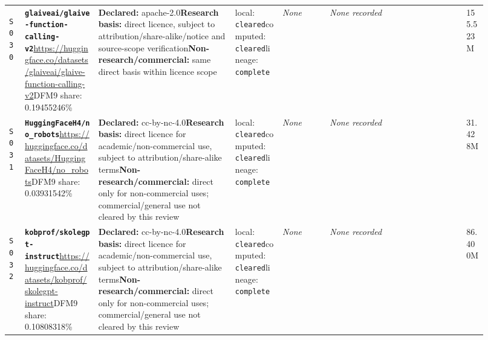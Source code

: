 \documentclass[9pt,a4paper]{article}
\newcommand{\srcid}[1]{\hypertarget{src:#1}{\texttt{#1}}}
\begin{document}
\begin{landscape}
\begin{longtable}{@{}L{0.03\linewidth}L{0.14\linewidth}L{0.26\linewidth}L{0.09\linewidth}L{0.09\linewidth}L{0.265\linewidth}L{0.045\linewidth}@{}}
\srcid{S030} & \textbf{\nolinkurl{glaiveai/glaive-function-calling-v2}}\newline \url{https://huggingface.co/datasets/glaiveai/glaive-function-calling-v2}\newline DFM9 share: 0.19455246\% & \textbf{Declared:} apache-2.0\newline \textbf{Research basis:} direct licence, subject to attribution/share-alike/notice and source-scope verification\newline \textbf{Non-research/commercial:} same direct basis within licence scope & local: \texttt{cleared}\newline computed: \texttt{cleared}\newline lineage: \texttt{complete} & \textit{None} & \textit{None recorded} & 155.523M \\
\srcid{S031} & \textbf{\nolinkurl{HuggingFaceH4/no_robots}}\newline \url{https://huggingface.co/datasets/HuggingFaceH4/no_robots}\newline DFM9 share: 0.03931542\% & \textbf{Declared:} cc-by-nc-4.0\newline \textbf{Research basis:} direct licence for academic/non-commercial use, subject to attribution/share-alike terms\newline \textbf{Non-research/commercial:} direct only for non-commercial uses; commercial/general use not cleared by this review & local: \texttt{cleared}\newline computed: \texttt{cleared}\newline lineage: \texttt{complete} & \textit{None} & \textit{None recorded} & 31.428M \\
\srcid{S032} & \textbf{\nolinkurl{kobprof/skolegpt-instruct}}\newline \url{https://huggingface.co/datasets/kobprof/skolegpt-instruct}\newline DFM9 share: 0.10808318\% & \textbf{Declared:} cc-by-nc-4.0\newline \textbf{Research basis:} direct licence for academic/non-commercial use, subject to attribution/share-alike terms\newline \textbf{Non-research/commercial:} direct only for non-commercial uses; commercial/general use not cleared by this review & local: \texttt{cleared}\newline computed: \texttt{cleared}\newline lineage: \texttt{complete} & \textit{None} & \textit{None recorded} & 86.400M \\

\end{longtable}
\end{landscape}
\end{document}
